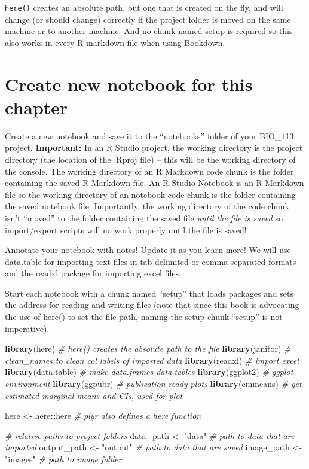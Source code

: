 \documentclass[]{book}
\newenvironment{Shaded}{\begin{snugshade}}{\end{snugshade}}
\newcommand{\KeywordTok}[1]{\textcolor[rgb]{0.13,0.29,0.53}{\textbf{#1}}}
\newcommand{\StringTok}[1]{\textcolor[rgb]{0.31,0.60,0.02}{#1}}
\newcommand{\CommentTok}[1]{\textcolor[rgb]{0.56,0.35,0.01}{\textit{#1}}}
\newcommand{\OperatorTok}[1]{\textcolor[rgb]{0.81,0.36,0.00}{\textbf{#1}}}
\newcommand{\NormalTok}[1]{#1}
\begin{document}
\texttt{here()} creates an absolute path, but one that is created on the
fly, and will change (or should change) correctly if the project folder
is moved on the same machine or to another machine. And no chunk named
setup is required so this also works in every R markdown file when using
Bookdown.

\section{Create new notebook for this
chapter}\label{create-new-notebook-for-this-chapter}

Create a new notebook and save it to the ``notebooks'' folder of your
BIO\_413 project. \textbf{Important:} In an R Studio project, the
working directory is the project directory (the location of the .Rproj
file) -- this will be the working directory of the console. The working
directory of an R Markdown code chunk is the folder containing the saved
R Markdown file. An R Studio Notebook is an R Markdown file so the
working directory of an notebook code chunk is the folder containing the
saved notebook file. Importantly, the working directory of the code
chunk isn't ``moved'' to the folder containing the saved file
\emph{until the file is saved} so import/export scripts will no work
properly until the file is saved!

Annotate your notebook with notes! Update it as you learn more! We will
use data.table for importing text files in tab-delimited or
comma-separated formats and the readxl package for importing excel
files.

Start each notebook with a chunk named ``setup'' that loads packages and
sets the address for reading and writing files (note that since this
book is advocating the use of here() to set the file path, naming the
setup chunk ``setup'' is not imperative).

\begin{Shaded}
\begin{Highlighting}[]
\KeywordTok{library}\NormalTok{(here) }\CommentTok{# here() creates the absolute path to the file}
\KeywordTok{library}\NormalTok{(janitor) }\CommentTok{# clean_names to clean col labels of imported data}
\KeywordTok{library}\NormalTok{(readxl) }\CommentTok{# import excel}
\KeywordTok{library}\NormalTok{(data.table) }\CommentTok{# make data.frames data.tables}
\KeywordTok{library}\NormalTok{(ggplot2) }\CommentTok{# ggplot environment}
\KeywordTok{library}\NormalTok{(ggpubr) }\CommentTok{# publication ready plots}
\KeywordTok{library}\NormalTok{(emmeans) }\CommentTok{# get estimated marginal means and CIs, used for plot}

\NormalTok{here <-}\StringTok{ }\NormalTok{here}\OperatorTok{::}\NormalTok{here }\CommentTok{# plyr also defines a here function}

\CommentTok{# relative paths to project folders}
\NormalTok{data_path <-}\StringTok{ "data"} \CommentTok{# path to data that are imported}
\NormalTok{output_path <-}\StringTok{ "output"} \CommentTok{# path to data that are saved}
\NormalTok{image_path <-}\StringTok{ "images"} \CommentTok{# path to image folder}
\end{Highlighting}
\end{Shaded}
\end{document}
